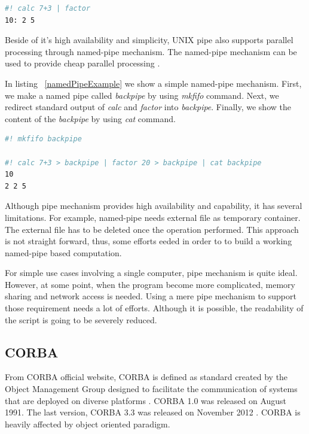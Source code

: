 \documentclass[conference]{IEEEtran}
\begin{document}
\begin{lstlisting}[caption=Unnamed pipe example, label=unnamedPipeExample, language=bash, basicstyle=\small, breaklines=true]
#! calc 7+3 | factor
10: 2 5
\end{lstlisting}

Beside of it's high availability and simplicity, UNIX pipe also supports parallel
processing through named-pipe mechanism. The named-pipe mechanism can be used to 
provide cheap parallel processing \cite{conway2003parallel}. 

In listing ~\ref{namedPipeExample} we show a simple named-pipe mechanism. First, we make
a named pipe called {\it backpipe} by using {\it mkfifo} command. Next, we redirect
standard output of {\it calc} and {\it factor} into {\it backpipe}. Finally, we show
the content of the {\it backpipe} by using {\it cat} command.

\begin{lstlisting}[caption=Named pipe example, label=namedPipeExample, language=bash, basicstyle=\small, breaklines=true]
#! mkfifo backpipe 

#! calc 7+3 > backpipe | factor 20 > backpipe | cat backpipe
10
2 2 5
\end{lstlisting}

Although pipe mechanism provides high availability and capability, 
it has several limitations. For example, named-pipe needs external file as temporary 
container. The external file has to be deleted once the operation performed. 
This approach is not straight forward, thus, some efforts eeded in order to 
to build a working named-pipe based computation. 

For simple use cases involving a single computer, pipe mechanism is quite ideal. 
However, at some point, when the program become more complicated, memory sharing 
and network access is needed. Using a mere pipe mechanism to support those 
requirement needs a lot of efforts. Although it is possible, the readability of
the script is going to be severely reduced.


\subsection{CORBA}

From CORBA official website, CORBA is defined as standard created by the Object 
Management Group designed to facilitate the communication of systems 
that are deployed on diverse platforms \cite{corba}. CORBA 1.0 was released on August 
1991. The last version, CORBA 3.3 was released on November 2012 \cite{corbaspec}.
CORBA is heavily affected by object oriented paradigm.
\end{document}
